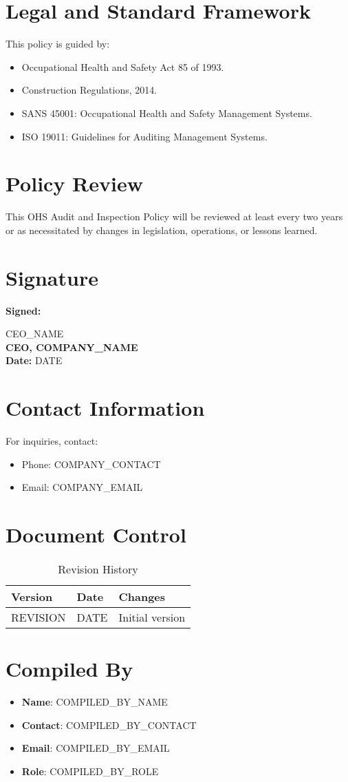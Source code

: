 \documentclass[12pt]{article}
\begin{document}
\section{Legal and Standard Framework}
This policy is guided by:
\begin{itemize}
    \item Occupational Health and Safety Act 85 of 1993.
    \item Construction Regulations, 2014.
    \item SANS 45001: Occupational Health and Safety Management Systems.
    \item ISO 19011: Guidelines for Auditing Management Systems.
\end{itemize}

\section{Policy Review}
This OHS Audit and Inspection Policy will be reviewed at least every two years or as necessitated by changes in legislation, operations, or lessons learned.

\section{Signature}
\textbf{Signed:}

{{CEO_NAME}}\\
\textbf{CEO, {{COMPANY_NAME}}}\\
\textbf{Date:} {{DATE}}

\section{Contact Information}
For inquiries, contact:
\begin{itemize}
    \item Phone: {{COMPANY_CONTACT}}
    \item Email: {{COMPANY_EMAIL}}
\end{itemize}

\section{Document Control}
\begin{table}[h]
    \centering
    \begin{tabular}{p{3cm}p{3cm}p{6cm}}
        \toprule
        \textbf{Version} & \textbf{Date} & \textbf{Changes} \\
        \midrule
        {{REVISION}} & {{DATE}} & Initial version \\
        \bottomrule
    \end{tabular}
    \caption{Revision History}
\end{table}

\section{Compiled By}
\begin{itemize}
    \item \textbf{Name}: {{COMPILED_BY_NAME}}
    \item \textbf{Contact}: {{COMPILED_BY_CONTACT}}
    \item \textbf{Email}: {{COMPILED_BY_EMAIL}}
    \item \textbf{Role}: {{COMPILED_BY_ROLE}}
\end{itemize}
\end{document}
